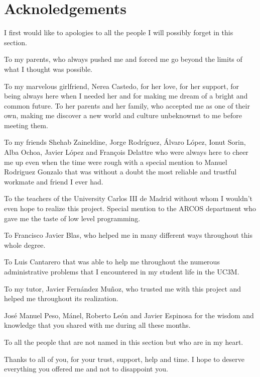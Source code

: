 \pagestyle{plain}
\chapter{Acknoledgements}
\setcounter{page}{1}
I first would like to apologies to all the people I will possibly forget in this section. 

To my parents, who always pushed me and forced me go beyond the limits of what I thought was possible.

To my marvelous girlfriend, Nerea Castedo, for her love, for her support, for being always here when I needed her and for making me dream of a bright and common future.
To her parents and her family, who accepted me as one of their own, making me discover a new world and culture unbeknownst to me before meeting them.

To my friends Shehab Zaineldine, Jorge Rodríguez, Álvaro López, Ionut Sorin, Alba Ochoa, Javier López and François Delattre who were always here to cheer me up even when the time were rough with a special mention to Manuel Rodriguez Gonzalo that was without a doubt the most reliable and trustful workmate and friend I ever had.

To the teachers of the University Carlos III de Madrid without whom I wouldn't even hope to realize this project. Special mention to the ARCOS department who gave me the taste of low level programming.

To Francisco Javier Blas, who helped me in many different ways throughout this whole degree.

To Luis Cantarero that was able to help me throughout the numerous administrative problems that I encountered in my student life in the UC3M.

To my tutor, Javier Fernández Muñoz, who trusted me with this project and helped me throughout its realization.

José Manuel Peso, Mánel, Roberto León and Javier Espinosa for the wisdom and knowledge that you shared with me during all these months.

To all the people that are not named in this section but who are in my heart.

Thanks to all of you, for your trust, support, help and time. I hope to deserve everything you offered me and not to disappoint you.
